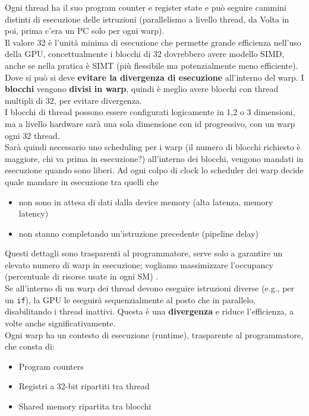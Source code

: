 Ogni thread ha il suo program counter e register state e può seguire cammini distinti di esecuzione delle istruzioni (parallelismo a livello thread, da Volta in poi, prima c'era un PC solo per ogni warp).\\

Il valore 32 è l'unità minima di esecuzione che permette grande efficienza nell'uso della GPU, concettualmente i blocchi di 32 dovrebbero avere modello SIMD, anche se nella pratica è SIMT (più flessibile ma potenzialmente meno efficiente). Dove si può si deve \textbf{evitare la divergenza di esecuzione} all'interno del warp. I \textbf{blocchi} vengono \textbf{divisi in warp}, quindi è meglio avere blocchi con thread multipli di 32, per evitare divergenza.\\

I blocchi di thread possono essere configurati logicamente in 1,2 o 3 dimensioni, ma a livello hardware sarà una sola dimensione con id progressivo, con un warp ogni 32 thread.\\

Sarà quindi necessario uno scheduling per i warp (il numero di blocchi richiesto è maggiore, chi va prima in esecuzione?) all'interno dei blocchi, vengono mandati in esecuzione quando sono liberi. Ad ogni colpo di clock lo scheduler dei warp decide quale mandare in esecuzione tra quelli che 
\begin{itemize}
	\item non sono in attesa di dati dalla device memory (alta latenza, memory latency)
	\item non stanno completando un'istruzione precedente (pipeline delay)
\end{itemize}
Questi dettagli sono trasparenti al programmatore, serve solo a garantire un elevato numero di warp in esecuzione; vogliamo massimizzare l'occupancy (percentuale di risorse usate in ogni SM) .\\

Se all'interno di un warp dei thread devono eseguire istruzioni diverse (e.g., per un \texttt{if}), la GPU le eseguirà sequenzialmente al posto che in parallelo, disabilitando i thread inattivi. Questa è una \textbf{divergenza} e riduce l'efficienza, a volte anche significativamente.  \\

Ogni warp ha un contesto di esecuzione (runtime), trasparente al programmatore, che consta di: 
\begin{itemize}
	\item Program counters
	\item Registri a 32-bit ripartiti tra thread
	\item Shared memory ripartita tra blocchi
\end{itemize} 


